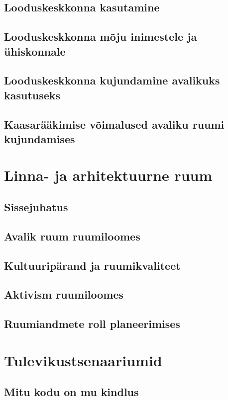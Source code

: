 \documentclass[]{book}
\begin{document}
\hypertarget{loodus_3.2}{%
\section{Looduskeskkonna kasutamine}\label{loodus_3.2}}

\hypertarget{loodus_3.3}{%
\section{Looduskeskkonna mõju inimestele ja ühiskonnale}\label{loodus_3.3}}

\hypertarget{loodus_3.4}{%
\section{Looduskeskkonna kujundamine avalikuks kasutuseks}\label{loodus_3.4}}

\hypertarget{loodus_3.5}{%
\section{Kaasarääkimise võimalused avaliku ruumi kujundamises}\label{loodus_3.5}}

\hypertarget{chapter4}{%
\chapter{Linna- ja arhitektuurne ruum}\label{chapter4}}

\hypertarget{sissejuhatus-4}{%
\section*{Sissejuhatus}\label{sissejuhatus-4}}

\hypertarget{linna_4.2}{%
\section{Avalik ruum ruumiloomes}\label{linna_4.2}}

\hypertarget{linna_4.3}{%
\section{Kultuuripärand ja ruumikvaliteet}\label{linna_4.3}}

\hypertarget{linna_4.4}{%
\section{Aktivism ruumiloomes}\label{linna_4.4}}

\hypertarget{linna_4.5}{%
\section{Ruumiandmete roll planeerimises}\label{linna_4.5}}

\hypertarget{chapter5}{%
\chapter{Tulevikustsenaariumid}\label{chapter5}}

\hypertarget{tuleviku_5.1}{%
\section{Mitu kodu on mu kindlus}\label{tuleviku_5.1}}


\end{document}
